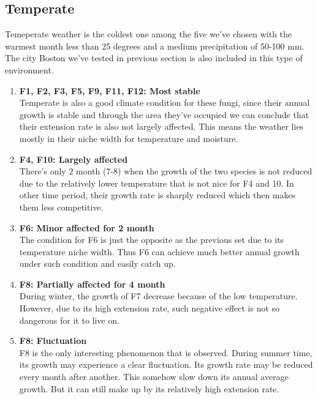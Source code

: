 \documentclass[a4paper,12pt]{article}
\begin{document}
\subsection{Temperate}
Temeperate weather is the coldest one among the five we've chosen with the warmest month less than 25 degrees and a medium precipitation of 50-100 mm. The city Boston we've tested in previous section is also included in this type of environment. 
\begin{enumerate}
\setlength{\itemsep}{0ex} %
\item \textbf{F1, F2, F3, F5, F9, F11, F12: Most stable} \\
Temperate is also a good climate condition for these fungi, since their annual growth is stable and through the area they've occupied we can conclude that their extension rate is also not largely affected. This means the weather lies mostly in their niche width for temperature and moisture.
\item \textbf{F4, F10: Largely affected} \\
There's only 2 month (7-8) when the growth of the two species is not reduced due to the relatively lower temperature that is not nice for F4 and 10. In other time period, their growth rate is sharply reduced which then makes them less competitive.
\item \textbf{F6: Minor affected for 2 month}\\
The condition for F6 is just the opposite as the previous set due to its temperature niche width. Thus F6 can achieve much better annual growth under such condition and easily catch up.
\item \textbf{F8: Partially affected for 4 month}\\
During winter, the growth of F7 decrease because of the low temperature. However, due to its high extension rate, such negative effect is not so dangerous for it to live on.
\item \textbf{F8: Fluctuation} \\
F8 is the only interesting phenomenon that is observed. During summer time, its growth may experience a clear fluctuation. Its growth rate may be reduced every month after another. This somehow slow down its annual average growth. But it can still make up by its relatively high extension rate.

\end{enumerate}
\end{document}
